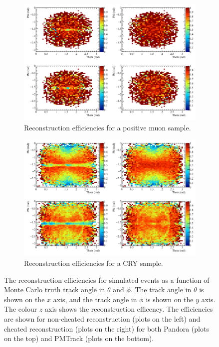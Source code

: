 \begin{figure}[h!]
  \centering
  \begin{subfigure}{0.8\textwidth}
    \centering
    \includegraphics[width=\textwidth]{Effic_AntiMuon_500V_All_PhiTheta}
    \caption{Reconstruction efficiencies for a positive muon sample.}
    \label{fig:SimEffic_ThetaPhi_AMu}
  \end{subfigure}
  \begin{subfigure}{0.8\textwidth}
    \centering
    \includegraphics[width=\textwidth]{Effic_Cosmics_500V_All_PhiTheta}
    \caption{Reconstruction efficiencies for a CRY sample.}
    \label{fig:SimEffic_ThetaPhi_CRY}
  \end{subfigure}
  \caption[The reconstruction efficiencies for simulated events as a function of Monte Carlo truth track angle in $\theta$ and $\phi$.]
          {The reconstruction efficiencies for simulated events as a function of Monte Carlo truth track angle in $\theta$ and $\phi$. The track angle in $\theta$ is shown on the $x$ axis, and the track angle in $\phi$ is shown on the $y$ axis. The colour $z$ axis shows the reconstruction efficency. The efficiencies are shown for non-cheated reconstruction (plots on the left) and cheated reconstruction (plots on the right) for both Pandora (plots on the top) and PMTrack (plots on the bottom).}
          \label{fig:SimEffic_ThetaPhi}
\end{figure}

